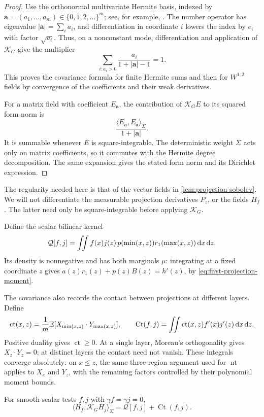 \begin{proof}
Use the orthonormal multivariate Hermite basis, indexed by $\mathbf{a}=(a_1,\ldots,a_m)\in\{0,1,2,\ldots\}^m$; see, for example, \cite[Sections 5--6]{Bell2015}. The number operator has eigenvalue $|\mathbf{a}|=\sum_i a_i$, and differentiation in coordinate $i$ lowers the index by $e_i$ with factor $\sqrt{a_i}$. Thus, on a nonconstant mode, differentiation and application of $\mathcal{K}_G$ give the multiplier
\[
 \sum_{i:a_i>0}\frac{a_i}{1+|\mathbf{a}|-1}=1.
\]
This proves the covariance formula for finite Hermite sums and then for $W^{1,2}$ fields by convergence of the coefficients and their weak derivatives.

For a matrix field with coefficient $E_{\mathbf{a}}$, the contribution of $\mathcal{K}_GE$ to its squared form norm is
\[
 \frac{\langle E_{\mathbf{a}},E_{\mathbf{a}}\rangle_\Sigma}
      {1+|\mathbf{a}|}.
\]
It is summable whenever $E$ is square-integrable. The deterministic weight $\Sigma$ acts only on matrix coefficients, so it commutes with the Hermite degree decomposition. The same expansion gives the stated form norm and its Dirichlet expression.
\end{proof}

The regularity needed here is that of the vector fields in \cref{lem:projection-sobolev}. We will not differentiate the measurable projection derivatives $P_z$, or the fields $H_f$. The latter need only be square-integrable before applying $\mathcal{K}_G$.

Define the scalar bilinear kernel
\[
 \mathcal{Q}[f,j]
  =\iint f(x)j(z)\,p(\min(x,z))r_1(\max(x,z))\,\mathrm{d} x\,\mathrm{d} z.
\]
Its density is nonnegative and has both marginals $\mu$: integrating at a fixed coordinate $z$ gives $a(z)r_1(z)+p(z)B(z)=h'(z)$, by \eqref{eq:first-projection-moment}.

The covariance also records the contact between projections at different layers. Define
\[
 \operatorname{ct}(x,z)
 =\frac1m\mathbb{E}[X_{\min(x,z)}\cdot Y_{\max(x,z)}],
 \qquad
 \operatorname{Ct}(f,j)
 =\iint\operatorname{ct}(x,z)f'(x)j'(z)\,\mathrm{d} x\,\mathrm{d} z.
\]
Positive duality gives $\operatorname{ct}\ge0$. At a single layer, Moreau's orthogonality gives $X_z\cdot Y_z=0$; at distinct layers the contact need not vanish. These integrals converge absolutely: on $x\le z$, the same three-region argument used for $\operatorname{nt}$ applies to $X_x$ and $Y_z$, with the remaining factors controlled by their polynomial moment bounds.

\begin{lemma}\label{lem:layer-covariance}
 For smooth scalar tests $f,j$ with $\gamma f=\gamma j=0$,
 \begin{equation}\label{eq:layer-gaussian-covariance}
  \langle H_f,\mathcal{K}_G H_j\rangle_\Sigma
    =\mathcal{Q}[f,j]+\operatorname{Ct}(f,j).
 \end{equation}
\end{lemma}

